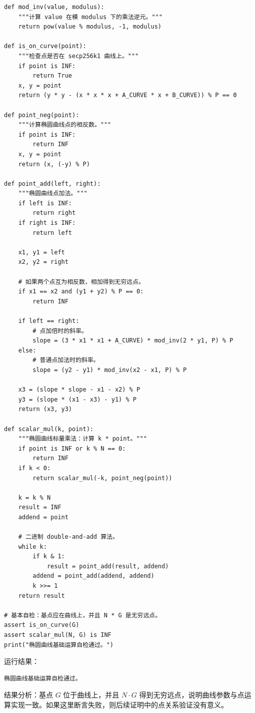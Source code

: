 \documentclass[a4paper]{article}
\begin{document}
	\begin{lstlisting}[caption={椭圆曲线点运算实现}]
def mod_inv(value, modulus):
    """计算 value 在模 modulus 下的乘法逆元。"""
    return pow(value % modulus, -1, modulus)

def is_on_curve(point):
    """检查点是否在 secp256k1 曲线上。"""
    if point is INF:
        return True
    x, y = point
    return (y * y - (x * x * x + A_CURVE * x + B_CURVE)) % P == 0

def point_neg(point):
    """计算椭圆曲线点的相反数。"""
    if point is INF:
        return INF
    x, y = point
    return (x, (-y) % P)

def point_add(left, right):
    """椭圆曲线点加法。"""
    if left is INF:
        return right
    if right is INF:
        return left

    x1, y1 = left
    x2, y2 = right

    # 如果两个点互为相反数，相加得到无穷远点。
    if x1 == x2 and (y1 + y2) % P == 0:
        return INF

    if left == right:
        # 点加倍时的斜率。
        slope = (3 * x1 * x1 + A_CURVE) * mod_inv(2 * y1, P) % P
    else:
        # 普通点加法时的斜率。
        slope = (y2 - y1) * mod_inv(x2 - x1, P) % P

    x3 = (slope * slope - x1 - x2) % P
    y3 = (slope * (x1 - x3) - y1) % P
    return (x3, y3)

def scalar_mul(k, point):
    """椭圆曲线标量乘法：计算 k * point。"""
    if point is INF or k % N == 0:
        return INF
    if k < 0:
        return scalar_mul(-k, point_neg(point))

    k = k % N
    result = INF
    addend = point

    # 二进制 double-and-add 算法。
    while k:
        if k & 1:
            result = point_add(result, addend)
        addend = point_add(addend, addend)
        k >>= 1
    return result

# 基本自检：基点应在曲线上，并且 N * G 是无穷远点。
assert is_on_curve(G)
assert scalar_mul(N, G) is INF
print("椭圆曲线基础运算自检通过。")
	\end{lstlisting}
	
	运行结果：
	\begin{lstlisting}[caption={椭圆曲线基础运算自检输出}]
椭圆曲线基础运算自检通过。
	\end{lstlisting}
	
	结果分析：基点 \(G\) 位于曲线上，并且 \(N\cdot G\) 得到无穷远点，说明曲线参数与点运算实现一致。如果这里断言失败，则后续证明中的点关系验证没有意义。
	
\end{document}
